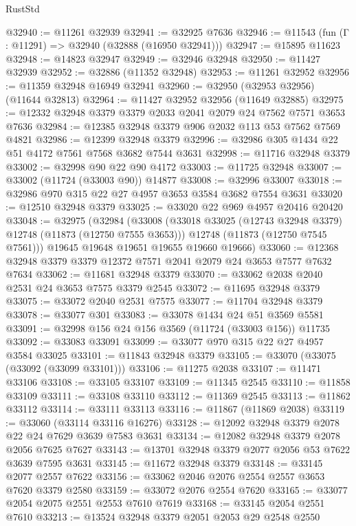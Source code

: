 \begin{lexlean}{RustStd}
\begin{coremodule}
@32940 := @11261 @32939
@32941 := @32925 @7636
@32946 := @11543 (fun (Γ : @11291) => @32940 (@32888 (@16950 @32941)))
@32947 := @15895 @11623
@32948 := @14823 @32947
@32949 := @32946 @32948
@32950 := @11427 @32939
@32952 := @32886 (@11352 @32948)
@32953 := @11261 @32952
@32956 := @11359 @32948 @16949 @32941
@32960 := @32950 (@32953 @32956) (@11644 @32813)
@32964 := @11427 @32952 @32956 (@11649 @32885)
@32975 := @12332 @32948 @3379 @3379 @2033 @2041 @2079 @24 @7562 @7571 @3653 @7636
@32984 := @12385 @32948 @3379 @906 @2032 @113 @53 @7562 @7569 @4821
@32986 := @12399 @32948 @3379
@32996 := @32986 @305 @1434 @22 @51 @4172 @7561 @7568 @3682 @7544 @3631
@32998 := @11716 @32948 @3379
@33002 := @32998 @90 @22 @90 @4172
@33003 := @11725 @32948
@33007 := @33002 (@11724 (@33003 @90)) @14877
@33008 := @32996 @33007
@33018 := @32986 @970 @315 @22 @27 @4957 @3653 @3584 @3682 @7554 @3631
@33020 := @12510 @32948 @3379
@33025 := @33020 @22 @969 @4957 @20416 @20420
@33048 := @32975
    (@32984
      (@33008
        (@33018 @33025 (@12743 @32948 @3379) @12748 (@11873 (@12750 @7555 @3653)))
        @12748
        (@11873 (@12750 @7545 @7561)))
      @19645
      @19648
      @19651
      @19655
      @19660
      @19666)
@33060 := @12368 @32948 @3379 @3379 @12372 @7571 @2041 @2079 @24 @3653 @7577 @7632 @7634
@33062 := @11681 @32948 @3379
@33070 := @33062 @2038 @2040 @2531 @24 @3653 @7575 @3379 @2545
@33072 := @11695 @32948 @3379
@33075 := @33072 @2040 @2531 @7575
@33077 := @11704 @32948 @3379
@33078 := @33077 @301
@33083 := @33078 @1434 @24 @51 @3569 @5581
@33091 := @32998 @156 @24 @156 @3569 (@11724 (@33003 @156)) @11735
@33092 := @33083 @33091
@33099 := @33077 @970 @315 @22 @27 @4957 @3584 @33025
@33101 := @11843 @32948 @3379
@33105 := @33070 (@33075 (@33092 (@33099 @33101)))
@33106 := @11275 @2038
@33107 := @11471 @33106
@33108 := @33105 @33107
@33109 := @11345 @2545
@33110 := @11858 @33109
@33111 := @33108 @33110
@33112 := @11369 @2545
@33113 := @11862 @33112
@33114 := @33111 @33113
@33116 := @11867 (@11869 @2038)
@33119 := @33060 (@33114 @33116 @16276)
@33128 := @12092 @32948 @3379 @2078 @22 @24 @7629 @3639 @7583 @3631
@33134 := @12082 @32948 @3379 @2078 @2056 @7625 @7627
@33143 := @13701 @32948 @3379 @2077 @2056 @53 @7622 @3639 @7595 @3631
@33145 := @11672 @32948 @3379
@33148 := @33145 @2077 @2557 @7622
@33156 := @33062 @2046 @2076 @2554 @2557 @3653 @7620 @3379 @2580
@33159 := @33072 @2076 @2554 @7620
@33165 := @33077 @2054 @2075 @2551 @2553 @7610 @7619
@33168 := @33145 @2054 @2551 @7610
@33213 := @13524
    @32948
    @3379
    @2051
    @2053
    @29
    @2548
    @2550

\end{coremodule}
\end{lexlean}
